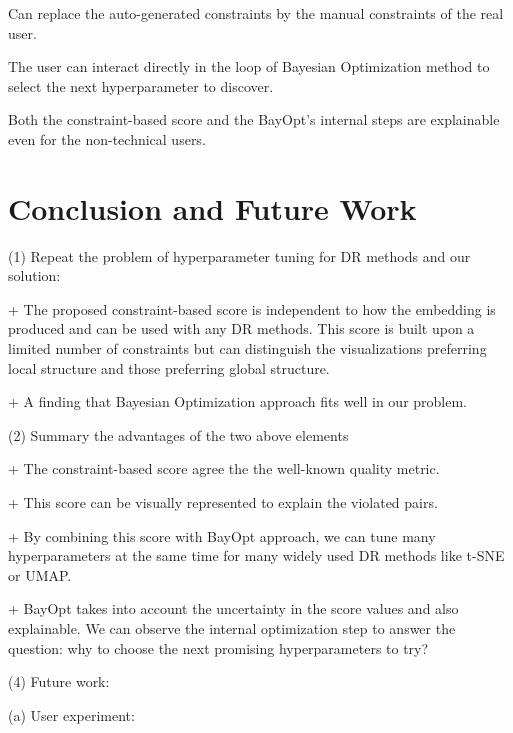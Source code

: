 \par
Can replace the auto-generated constraints by the manual constraints of the real user.

\par
The user can interact directly in the loop of Bayesian Optimization method to select the next hyperparameter to discover.


\par
Both the constraint-based score and the BayOpt's internal steps are explainable even for the non-technical users. 



\section{Conclusion and Future Work}

\par (1) Repeat the problem of hyperparameter tuning for DR methods and our solution:

+ The proposed constraint-based score is independent to how the embedding is produced and can be used with any DR methods.
This score is built upon a limited number of constraints but can distinguish the visualizations preferring local structure and those preferring global structure.

+ A finding that Bayesian Optimization approach fits well in our problem.


\vspace{8pt}
\par (2) Summary the advantages of the two above elements

+ The constraint-based score agree the the well-known quality metric.

+ This score can be visually represented to explain the violated pairs.

+ By combining this score with BayOpt approach, we can tune many hyperparameters at the same time for many widely used DR methods like t-SNE or UMAP.

+ BayOpt takes into account the uncertainty in the score values and also explainable. We can observe the internal optimization step to answer the question: why to choose the next promising hyperparameters to try?


\vspace{8pt}
\par (4) Future work:

(a) User experiment:

